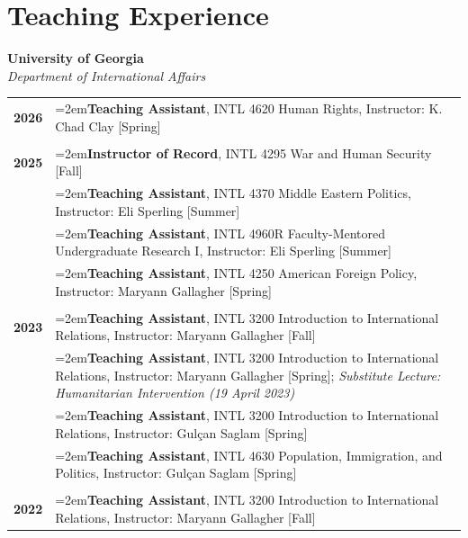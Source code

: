 \documentclass[letterpaper,12pt]{article}
\begin{document}
\section{Teaching Experience}
\textbf{University of Georgia}\\
\textit{Department of International Affairs}
\begin{xltabular}{\dimexpr\textwidth-0in}{p{1.5in}X}

\textbf{2026} 	& \hangindent=2em\textbf{Teaching Assistant}, INTL 4620 Human Rights, Instructor: K. Chad Clay [Spring]\\ \\

\textbf{2025} 	& \hangindent=2em\textbf{Instructor of Record}, INTL 4295 War and Human Security [Fall]\\
			
			& \hangindent=2em\textbf{Teaching Assistant}, INTL 4370 Middle Eastern Politics, Instructor: Eli Sperling [Summer]\\
			
			& \hangindent=2em\textbf{Teaching Assistant}, INTL 4960R Faculty-Mentored Undergraduate Research I, Instructor: Eli Sperling [Summer]\\
			
			& \hangindent=2em\textbf{Teaching Assistant}, INTL 4250 American Foreign Policy, Instructor: Maryann Gallagher [Spring]\\ \\

\textbf{2023} 	& \hangindent=2em\textbf{Teaching Assistant}, INTL 3200 Introduction to International Relations, \mbox{Instructor:} Maryann Gallagher [Fall]\\

			& \hangindent=2em\textbf{Teaching Assistant}, INTL 3200 Introduction to International Relations, \mbox{Instructor:} Maryann Gallagher [Spring]; \textit{Substitute Lecture: Humanitarian Intervention (19 April 2023)}\\
			
			& \hangindent=2em\textbf{Teaching Assistant}, INTL 3200 Introduction to International Relations, \mbox{Instructor:} Gulçan Saglam [Spring]\\
			
			& \hangindent=2em\textbf{Teaching Assistant}, INTL 4630 Population, Immigration, and Politics, \mbox{Instructor:} Gulçan Saglam [Spring]\\ \\
			
\textbf{2022} 	& \hangindent=2em\textbf{Teaching Assistant}, INTL 3200 Introduction to International Relations, \mbox{Instructor:} Maryann Gallagher [Fall]			
\end{xltabular}
\end{document}
